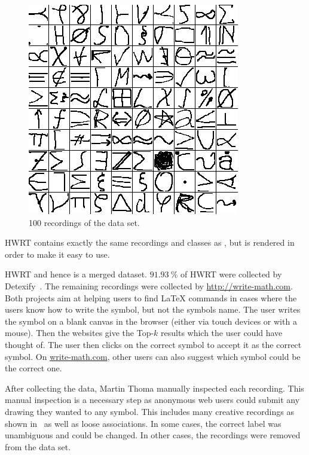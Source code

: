 \begin{figure}[h]
    \centering
    \includegraphics*[width=\linewidth, keepaspectratio]{figures/sample-images.png}
    \caption{100 recordings of the \dbNameVersion{} data set.}
    \label{fig:100-data-items}
\end{figure}

HWRT contains exactly the same recordings and classes as \dbName, but \dbName{}
is rendered in order to make it easy to use.

HWRT and hence \dbName{} is a merged dataset. $\SI{91.93}{\percent}$ of HWRT
were collected by Detexify~\cite{Kirsch,Kirsch2014}. The remaining recordings
were collected by \href{http://write-math.com}{http://write-math.com}. Both
projects aim at helping users to find \LaTeX{} commands in cases where the
users know how to write the symbol, but not the symbols name. The user writes
the symbol on a blank canvas in the browser (either via touch devices or with a
mouse). Then the websites give the Top-$k$ results which the user could have
thought of. The user then clicks on the correct symbol to accept it as the
correct symbol. On \href{http://write-math.com}{write-math.com}, other users
can also suggest which symbol could be the correct one.

After collecting the data, Martin Thoma manually inspected each recording. This
manual inspection is a necessary step as anonymous web users could submit any
drawing they wanted to any symbol. This includes many creative recordings as
shown in~\cite{Kirsch,Thoma:2014} as well as loose associations. In some cases,
the correct label was unambiguous and could be changed. In other cases, the
recordings were removed from the data set.


